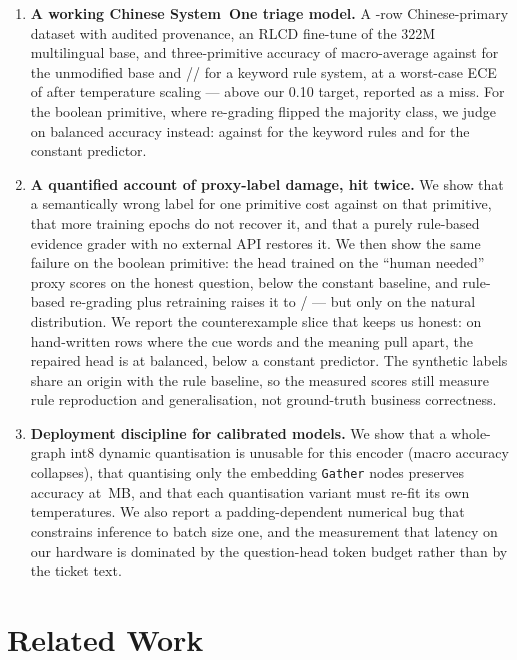 \documentclass[11pt,a4paper]{article}
\begin{document}
\begin{enumerate}
  \item \textbf{A working Chinese System~One triage model.} A \DataTotalRows-row Chinese-primary dataset with audited provenance, an RLCD fine-tune of the 322M multilingual base, and three-primitive accuracy of \MacroAcc{} macro-average against \OrigAccMacro{} for the unmodified base and \RulesAccChoice/\RulesAccScore/\RulesAccNoul{} for a keyword rule system, at a worst-case ECE of \WorstEce{} after temperature scaling --- above our \num{0.10} target, reported as a miss. For the boolean primitive, where re-grading flipped the majority class, we judge on balanced accuracy instead: \BAccNoul{} against \RulesBAccNoul{} for the keyword rules and \MajAccNoul{} for the constant predictor.
  \item \textbf{A quantified account of proxy-label damage, hit twice.} We show that a semantically wrong label for one primitive cost \AccScoreVZeroTwo{} against \AccScore{} on that primitive, that more training epochs do not recover it, and that a purely rule-based evidence grader with no external API restores it. We then show the same failure on the boolean primitive: the head trained on the ``human needed'' proxy scores \OldHeadAccNoul{} on the honest question, below the constant baseline, and rule-based re-grading plus retraining raises it to \AccNoul{}/\BAccNoul{} --- but only on the natural distribution. We report the counterexample slice that keeps us honest: on \AntibodyN{} hand-written rows where the cue words and the meaning pull apart, the repaired head is at \AntibodyBAcc{} balanced, below a constant predictor. The synthetic labels share an origin with the rule baseline, so the measured scores still measure rule reproduction and generalisation, not ground-truth business correctness.
  \item \textbf{Deployment discipline for calibrated models.} We show that a whole-graph int8 dynamic quantisation is unusable for this encoder (macro accuracy collapses), that quantising only the embedding \texttt{Gather} nodes preserves accuracy at \ModelMb\,MB, and that each quantisation variant must re-fit its own temperatures. We also report a padding-dependent numerical bug that constrains inference to batch size one, and the measurement that latency on our hardware is dominated by the question-head token budget rather than by the ticket text.
\end{enumerate}

\section{Related Work}
\end{document}
